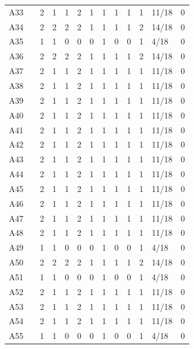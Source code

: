 {\begin{longtable}{p{0.55cm}p{0.9cm}rrrrrrrrrp{1.1cm}p{1.0cm}}
A33 & \cite{10972345} & 2 & 1 & 1 & 2 & 1 & 1 & 1 & 1 & 1 & 11/18 & 0 \\
A34 & \cite{10897877} & 2 & 2 & 2 & 2 & 1 & 1 & 1 & 1 & 2 & 14/18 & 0 \\
A35 & \cite{11153681} & 1 & 1 & 0 & 0 & 0 & 1 & 0 & 0 & 1 & 4/18 & 0 \\
A36 & \cite{11171742} & 2 & 2 & 2 & 2 & 1 & 1 & 1 & 1 & 2 & 14/18 & 0 \\
A37 & \cite{11171299} & 2 & 1 & 1 & 2 & 1 & 1 & 1 & 1 & 1 & 11/18 & 0 \\
A38 & \cite{11166257} & 2 & 1 & 1 & 2 & 1 & 1 & 1 & 1 & 1 & 11/18 & 0 \\
A39 & \cite{11135745} & 2 & 1 & 1 & 2 & 1 & 1 & 1 & 1 & 1 & 11/18 & 0 \\
A40 & \cite{SHINGNE2025103445} & 2 & 1 & 1 & 2 & 1 & 1 & 1 & 1 & 1 & 11/18 & 0 \\
A41 & \cite{KOTANGALE2025103643} & 2 & 1 & 1 & 2 & 1 & 1 & 1 & 1 & 1 & 11/18 & 0 \\
A42 & \cite{HALGAMUGE2025104128} & 2 & 1 & 1 & 2 & 1 & 1 & 1 & 1 & 1 & 11/18 & 0 \\
A43 & \cite{KHADIDOS2025100782} & 2 & 1 & 1 & 2 & 1 & 1 & 1 & 1 & 1 & 11/18 & 0 \\
A44 & \cite{https://doi.org/10.1002/eng2.70419} & 2 & 1 & 1 & 2 & 1 & 1 & 1 & 1 & 1 & 11/18 & 0 \\
A45 & \cite{https://doi.org/10.1049/cmu2.70067} & 2 & 1 & 1 & 2 & 1 & 1 & 1 & 1 & 1 & 11/18 & 0 \\
A46 & \cite{Andreou2025} & 2 & 1 & 1 & 2 & 1 & 1 & 1 & 1 & 1 & 11/18 & 0 \\
A47 & \cite{Sharma2025} & 2 & 1 & 1 & 2 & 1 & 1 & 1 & 1 & 1 & 11/18 & 0 \\
A48 & \cite{Mujlid2025} & 2 & 1 & 1 & 2 & 1 & 1 & 1 & 1 & 1 & 11/18 & 0 \\
A49 & \cite{Sefati2025} & 1 & 1 & 0 & 0 & 0 & 1 & 0 & 0 & 1 & 4/18 & 0 \\
A50 & \cite{Naik2025} & 2 & 2 & 2 & 2 & 1 & 1 & 1 & 1 & 2 & 14/18 & 0 \\
A51 & \cite{Alzahrani2025} & 1 & 1 & 0 & 0 & 0 & 1 & 0 & 0 & 1 & 4/18 & 0 \\
A52 & \cite{Ahmed2025} & 2 & 1 & 1 & 2 & 1 & 1 & 1 & 1 & 1 & 11/18 & 0 \\
A53 & \cite{Singh2025} & 2 & 1 & 1 & 2 & 1 & 1 & 1 & 1 & 1 & 11/18 & 0 \\
A54 & \cite{Alharbi2025} & 2 & 1 & 1 & 2 & 1 & 1 & 1 & 1 & 1 & 11/18 & 0 \\
A55 & \cite{Khan2025} & 1 & 1 & 0 & 0 & 0 & 1 & 0 & 0 & 1 & 4/18 & 0 \\

\end{longtable}}
